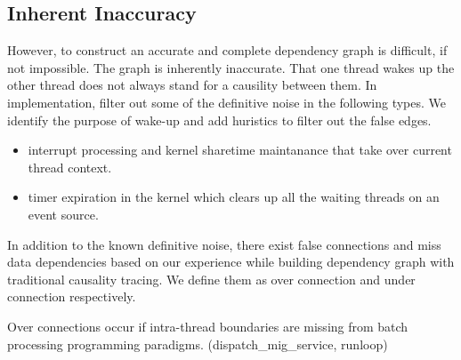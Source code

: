 \subsection{Inherent Inaccuracy}

However, to construct an accurate and complete dependency graph is difficult,
if not impossible. The graph is inherently inaccurate. That one thread wakes
up the other thread does not always stand for a causility between them. In
implementation, \xxx filter out some of the definitive noise in the following
types. We identify the purpose of wake-up and add huristics to filter out the
false edges.

\begin{itemize}

\item interrupt processing and kernel sharetime maintanance that take over
current thread context.

\item timer expiration in the kernel which clears up all the waiting threads on
an event source.

\end{itemize}

In addition to the known definitive noise, there exist false connections and
miss data dependencies based on our experience while building dependency graph
with traditional causality tracing. We define them as over connection and under
connection respectively.

Over connections occur if intra-thread boundaries are missing from batch
processing programming paradigms. (dispatch\_mig\_service, runloop)

